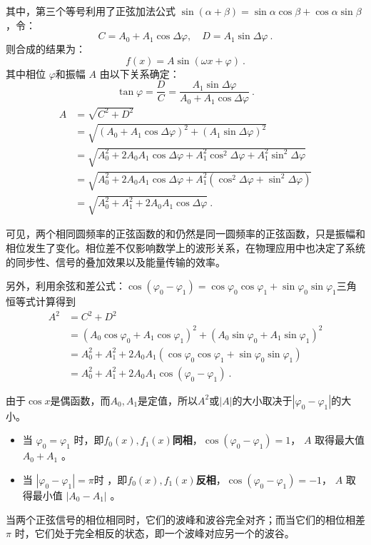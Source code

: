 其中，第三个等号利用了正弦加法公式 $\sin(\alpha + \beta) = \sin\alpha \cos\beta + \cos\alpha \sin\beta$，令：
\begin{equation}
C = A_0 + A_1 \cos \Delta \varphi, \quad D = A_1 \sin \Delta \varphi~.
\end{equation}
则合成的结果为：
\begin{equation}
f(x) = A \sin(\omega x + \varphi)~.
\end{equation}
其中相位 $\varphi$和振幅 $A$ 由以下关系确定：
\begin{equation}
\tan\varphi = \frac{D}{C} = \frac{A_1 \sin \Delta \varphi}{A_0 + A_1 \cos \Delta \varphi}~.
\end{equation}
\begin{equation}
\begin{split}
A &= \sqrt{C^2 + D^2} \\
&= \sqrt{(A_0 + A_1 \cos \Delta \varphi)^2 + (A_1 \sin \Delta \varphi)^2} \\
&= \sqrt{A_0^2 + 2 A_0 A_1 \cos \Delta \varphi + A_1^2 \cos^2 \Delta \varphi + A_1^2 \sin^2 \Delta \varphi} \\
&= \sqrt{A_0^2 + 2 A_0 A_1 \cos \Delta \varphi + A_1^2 (\cos^2 \Delta \varphi + \sin^2 \Delta \varphi)} \\
&= \sqrt{A_0^2 + A_1^2 + 2 A_0 A_1 \cos \Delta \varphi}~.
\end{split}
\end{equation}

可见，两个相同圆频率的正弦函数的和仍然是同一圆频率的正弦函数，只是振幅和相位发生了变化。相位差不仅影响数学上的波形关系，在物理应用中也决定了系统的同步性、信号的叠加效果以及能量传输的效率。

另外，利用余弦和差公式：$\cos(\varphi_0 - \varphi_1) = \cos\varphi_0 \cos\varphi_1 + \sin\varphi_0 \sin\varphi_1$三角恒等式计算得到
\begin{equation}
\begin{split}
A^2 &= C^2+D^2\\
&=(A_0\cos\varphi_0 + A_1\cos\varphi_1)^2+(A_0\sin\varphi_0 + A_1\sin\varphi_1)^2\\
&=A_0^2 + A_1^2 + 2 A_0 A_1 (\cos\varphi_0 \cos\varphi_1 + \sin\varphi_0 \sin\varphi_1)\\
&=A_0^2 + A_1^2 + 2 A_0 A_1 \cos(\varphi_0 - \varphi_1)~.
\end{split}
\end{equation}

由于$\cos x$是偶函数，而$A_0,A_1$是定值，所以$A^2$或$|A|$的大小取决于$|\varphi_0 - \varphi_1|$的大小。
\begin{itemize}
\item 当 $\varphi_0 = \varphi_1$ 时，即$f_0(x),f_1(x)$\textbf{同相}，$\cos(\varphi_0 - \varphi_1) = 1$， $A$  取得最大值  $A_0 + A_1$ 。
\item 当 $|\varphi_0 - \varphi_1| = \pi$时 ，即$f_0(x),f_1(x)$\textbf{反相}，$\cos(\varphi_0 - \varphi_1) = -1$， $A$  取得最小值  $|A_0 - A_1|$ 。
\end{itemize}
当两个正弦信号的相位相同时，它们的波峰和波谷完全对齐；而当它们的相位相差 $\pi$ 时，它们处于完全相反的状态，即一个波峰对应另一个的波谷。


